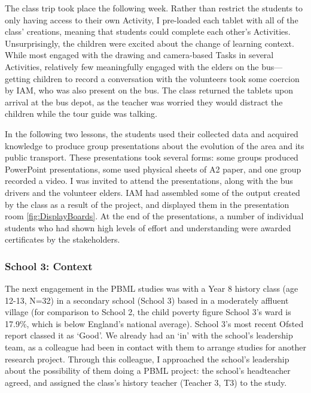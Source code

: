 The class trip took place the following week. Rather than restrict the students to only having access to their own Activity, I pre-loaded each tablet with all of the class' creations, meaning that students could complete each other's Activities. Unsurprisingly, the children were excited about the change of learning context. While most engaged with the drawing and camera-based Tasks in several Activities, relatively few meaningfully engaged with the elders on the bus---getting children to record a conversation with the volunteers took some coercion by IAM, who was also present on the bus. The class returned the tablets upon arrival at the bus depot, as the teacher was worried they would distract the children while the tour guide was talking.

In the following two lessons, the students used their collected data and acquired knowledge to produce group presentations about the evolution of the area and its public transport. These presentations took several forms: some groups produced PowerPoint presentations, some used physical sheets of A2 paper, and one group recorded a video. I was invited to attend the presentations, along with the bus drivers and the volunteer elders. IAM had assembled some of the output created by the class as a result of the project, and displayed them in the presentation room \ref{fig:DisplayBoards}. At the end of the presentations, a number of individual students who had shown high levels of effort and understanding were awarded certificates by the stakeholders.


\subsubsection{School 3: Context}
The next engagement in the PBML studies was with a Year 8 history class (age 12-13, N=32) in a secondary school (School 3) based in a moderately affluent village (for comparison to School 2, the child poverty figure School 3's ward is 17.9\%, which is below England's national average). School 3's most recent Ofsted report classed it as `Good'. We already had an `in' with the school's leadership team, as a colleague had been in contact with them to arrange studies for another research project. Through this colleague, I approached the school's leadership about the possibility of them doing a PBML project: the school's headteacher agreed, and assigned the class's history teacher (Teacher 3, T3) to the study. 

